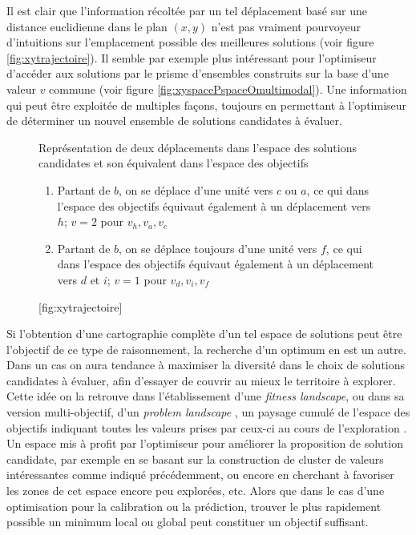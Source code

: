 Il est clair que l'information récoltée par un tel déplacement basé sur une distance euclidienne dans le plan $(x,y)$ n'est pas vraiment pourvoyeur d'intuitions sur l'emplacement possible des meilleures solutions (voir figure \ref{fig:xytrajectoire}). Il semble par exemple plus intéressant pour l'optimiseur d'accéder aux solutions par le prisme d'ensembles construits sur la base d'une valeur $v$ commune (voir figure \ref{fig:xyspacePspaceOmultimodal}). Une information qui peut être exploitée de multiples façons, toujours en permettant à l'optimiseur de déterminer un nouvel ensemble de solutions candidates à évaluer.

\begin{figure}[!htbp]
	\begin{sidecaption}[fortoc]{Représentation de deux déplacements dans l'espace des solutions candidates et son équivalent dans l'espace des objectifs
	\parbox{\marginparwidth}{
	\begin{enumerate}[label=(\alph*),labelindent=\parindent,leftmargin=*]
	        \item Partant de $b$, on se déplace d'une unité vers $c$ ou $a$, ce qui dans l'espace des objectifs équivaut également à un déplacement vers $h$; $v=2$ pour $v_h, v_a, v_c$
	        \item Partant de $b$, on se déplace toujours d'une unité vers $f$, ce qui dans l'espace des objectifs équivaut également à un déplacement vers $d$ et $i$; $v=1$ pour $v_d,v_i,v_f$
	\end{enumerate}}}[fig:xytrajectoire]
	 \centering
	  \qquad
	\end{sidecaption}
\end{figure}

Si l'obtention d'une cartographie complète d'un tel espace de solutions peut être l'objectif de ce type de raisonnement, la recherche d'un optimum en est un autre. Dans un cas on aura tendance à maximiser la diversité dans le choix de solutions candidates à évaluer, afin d'essayer de couvrir au mieux le territoire à explorer. Cette idée on la retrouve dans l'établissement d'une \textit{fitness landscape}, ou dans sa version multi-objectif, d'un \textit{problem landscape} \autocite[93-94]{Weise2011}, un paysage cumulé de l'espace des objectifs indiquant toutes les valeurs prises par ceux-ci au cours de l'exploration . Un espace mis à profit par l'optimiseur pour améliorer la proposition de solution candidate, par exemple en se basant sur la construction de cluster de valeurs intéressantes comme indiqué précédemment, ou encore en cherchant à favoriser les zones de cet espace encore peu explorées, etc. Alors que dans le cas d'une optimisation pour la calibration ou la prédiction, trouver le plus rapidement possible un minimum local ou global peut constituer un objectif suffisant.

